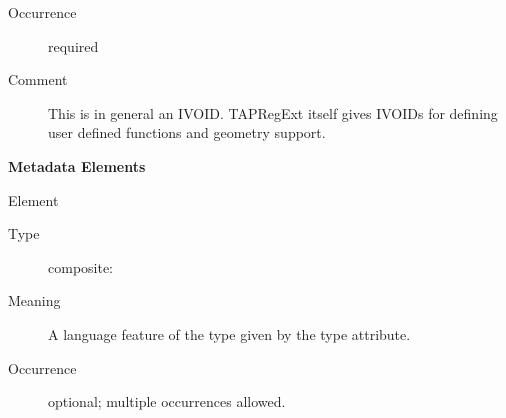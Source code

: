\documentclass{ivoa}
\begin{document}
\begin{generated}
\begin{bigdescription}
\begin{description}
\item[Occurrence] required
\item[Comment] 
          This is in general an IVOID.  TAPRegExt itself gives
          IVOIDs for defining user defined functions and geometry
          support.
        
\end{description}


\end{bigdescription}\endgroup



\vspace{0.5ex}\noindent\textbf{ Metadata Elements}

\begingroup\small\begin{bigdescription}\item[Element \xmlel{feature}]
\begin{description}
\item[Type] composite: 
\item[Meaning] 
            A language feature of the type given by the
            type attribute.
          
\item[Occurrence] optional; multiple occurrences allowed.

\end{description}


\end{bigdescription}\endgroup

\endgroup
\end{generated}

\end{document}
